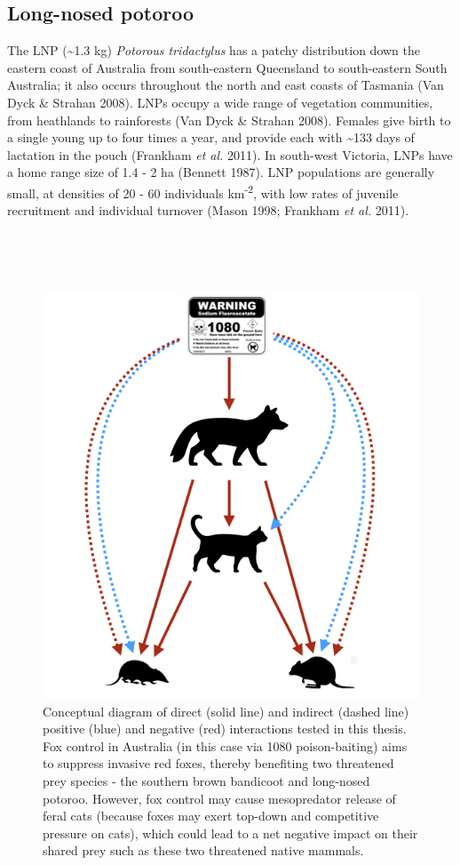 \documentclass[11pt,a4paper,titlepage,twoside,openright]{style/unimelbthesis}
\begin{document}
\begin{mainmatter}
\hypertarget{long-nosed-potoroo}{%
\subsection{Long-nosed potoroo}\label{long-nosed-potoroo}}

The LNP (\textasciitilde1.3 kg) \emph{Potorous tridactylus} has a patchy distribution down the eastern coast of Australia from south-eastern Queensland to south-eastern South Australia; it also occurs throughout the north and east coasts of Tasmania (Van Dyck \& Strahan 2008). LNPs occupy a wide range of vegetation communities, from heathlands to rainforests (Van Dyck \& Strahan 2008). Females give birth to a single young up to four times a year, and provide each with \textasciitilde133 days of lactation in the pouch (Frankham \emph{et al.} 2011). In south-west Victoria, LNPs have a home range size of 1.4 - 2 ha (Bennett 1987). LNP populations are generally small, at densities of 20 - 60 individuals km\textsuperscript{-2}, with low rates of juvenile recruitment and individual turnover (Mason 1998; Frankham \emph{et al.} 2011).

\newpage

\(~\)

\(~\)
\begin{figure}

{\centering \includegraphics[width=0.7\linewidth]{figure/conceptual_diagram} 

}

\caption{Conceptual diagram of direct (solid line) and indirect (dashed line) positive (blue) and negative (red) interactions tested in this thesis. Fox control in Australia (in this case via 1080 poison-baiting) aims to suppress invasive red foxes, thereby benefiting two threatened prey species - the southern brown bandicoot and long-nosed potoroo. However, fox control may cause mesopredator release of feral cats (because foxes may exert top-down and competitive pressure on cats), which could lead to a net negative impact on their shared prey such as these two threatened native mammals.}\label{fig:intro-conceptual}
\end{figure}
\hypertarget{otways17}{%
}
\end{mainmatter}
\end{document}
